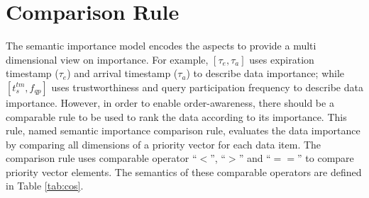 \section{Comparison Rule}
The semantic importance model encodes the aspects to provide a multi dimensional view on importance.
For example, $[\tau_{e}, \tau_{a}]$ uses expiration timestamp ($\tau_{e}$) and arrival timestamp ($\tau_{a}$) to describe data importance; while $[t^{tm}_{s}, f_{qp}]$ uses trustworthiness and query participation frequency to describe data importance. 
However, in order to enable order-awareness, there should be a comparable rule to be used to rank the data according to its importance. 
This rule, named semantic importance comparison rule, evaluates the data importance by comparing all dimensions of a priority vector for each data item. 
The comparison rule uses comparable operator ``$<$'', ``$>$'' and ``$==$'' to compare priority vector elements. 
The semantics of these comparable operators are defined in Table \ref{tab:cos}.

